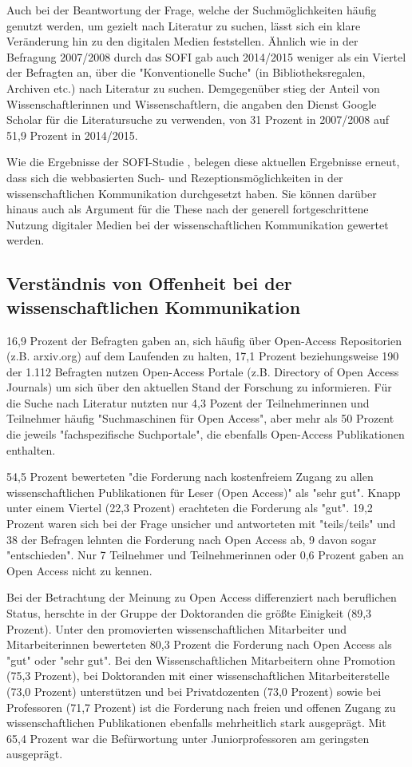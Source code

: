 Auch bei der Beantwortung der Frage, welche der Suchmöglichkeiten häufig genutzt werden, um gezielt nach Literatur zu suchen, lässt sich ein klare Veränderung hin zu den digitalen Medien feststellen. Ähnlich wie in der Befragung 2007/2008 durch das SOFI gab auch 2014/2015 weniger als ein Viertel der Befragten an, über die "Konventionelle Suche" (in Bibliotheksregalen, Archiven etc.) nach Literatur zu suchen. Demgegenüber stieg der Anteil von Wissenschaftlerinnen und Wissenschaftlern, die angaben den Dienst Google Scholar für die Literatursuche zu verwenden, von 31 Prozent in 2007/2008 auf 51,9 Prozent in 2014/2015.

Wie die Ergebnisse der SOFI-Studie \cite{Hanekop_2014}, belegen diese aktuellen Ergebnisse erneut, dass sich die webbasierten Such- und Rezeptionsmöglichkeiten in der wissenschaftlichen Kommunikation durchgesetzt haben. Sie können darüber hinaus auch als Argument für die These nach der generell fortgeschrittene Nutzung digitaler Medien bei der wissenschaftlichen Kommunikation gewertet werden.

\subsection{Verständnis von Offenheit bei der wissenschaftlichen Kommunikation}

16,9 Prozent der Befragten gaben an, sich häufig über Open-Access Repositorien (z.B. arxiv.org) auf dem Laufenden zu halten, 17,1 Prozent beziehungsweise 190 der 1.112 Befragten nutzen Open-Access Portale (z.B. Directory of Open Access Journals) um sich über den aktuellen Stand der Forschung zu informieren. Für die Suche nach Literatur nutzten nur 4,3 Pozent der Teilnehmerinnen und Teilnehmer häufig "Suchmaschinen für Open Access", aber mehr als 50 Prozent die jeweils "fachspezifische Suchportale", die ebenfalls Open-Access Publikationen enthalten.

54,5 Prozent bewerteten "die Forderung nach kostenfreiem Zugang zu allen wissenschaftlichen Publikationen für Leser (Open Access)" als "sehr gut". Knapp unter einem Viertel (22,3 Prozent) erachteten die Forderung als "gut". 19,2 Prozent waren sich bei der Frage unsicher und antworteten mit "teils/teils" und 38 der Befragen lehnten die Forderung nach Open Access ab, 9 davon sogar "entschieden". Nur 7 Teilnehmer und Teilnehmerinnen oder 0,6 Prozent gaben an Open Access nicht zu kennen.

Bei der Betrachtung der Meinung zu Open Access differenziert nach beruflichen Status, herschte in der Gruppe der Doktoranden die größte Einigkeit (89,3 Prozent). Unter den promovierten wissenschaftlichen Mitarbeiter und Mitarbeiterinnen bewerteten 80,3 Prozent die Forderung nach Open Access als "gut" oder "sehr gut". Bei den Wissenschaftlichen Mitarbeitern ohne Promotion (75,3 Prozent), bei Doktoranden mit einer wissenschaftlichen Mitarbeiterstelle (73,0 Prozent) unterstützen und bei Privatdozenten (73,0 Prozent) sowie bei Professoren (71,7 Prozent) ist die Forderung nach freien und offenen Zugang zu wissenschaftlichen Publikationen ebenfalls mehrheitlich stark ausgeprägt. Mit 65,4 Prozent war die Befürwortung unter Juniorprofessoren am geringsten ausgeprägt.

